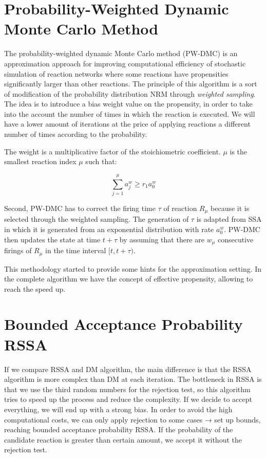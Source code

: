\hypertarget{probability-weighted-dynamic-monte-carlo-method}{%
\section{\texorpdfstring{\textbf{Probability-Weighted Dynamic Monte
Carlo
Method}}{Probability-Weighted Dynamic Monte Carlo Method}}\label{probability-weighted-dynamic-monte-carlo-method}}

The probability-weighted dynamic Monte Carlo method (PW-DMC) is an
approximation approach for improving computational efficiency of
stochastic simulation of reaction networks where some reactions have
propensities significantly larger than other reactions. The principle of
this algorithm is a sort of modification of the probability distribution
NRM through \emph{weighted sampling}. The idea is to introduce a bias
weight value on the propensity, in order to take into the account the
number of times in which the reaction is executed. We will have a lower
amount of iterations at the price of applying reactions a different
number of times according to the probability.

The weight is a multiplicative factor of the stoichiometric coefficient.
$\mu$ is the smallest reaction index $\mu$ such that:

$$
\sum^{\mu}_{j=1} a^w_j \geq r_1 a^w_0 
$$

Second, PW-DMC has to correct the firing time $\tau$ of reaction $R_\mu$
because it is selected through the weighted sampling. The generation of
$\tau$ is adapted from SSA in which it is generated from an exponential
distribution with rate $a^w_0$. PW-DMC then updates the state at time
$t + \tau$ by assuming that there are $w_\mu$ consecutive firings of $R_\mu$ in
the time interval $[t,t + \tau)$.

This methodology started to provide some hints for the approximation
setting. In the complete algorithm we have the concept of effective
propensity, allowing to reach the speed up.

\hypertarget{bounded-acceptance-probability-rssa}{%
\section{Bounded Acceptance Probability
RSSA}\label{bounded-acceptance-probability-rssa}}

If we compare RSSA and DM algorithm, the main difference is that the
RSSA algorithm is more complex than DM at each iteration. The bottleneck
in RSSA is that we use the third random numbers for the rejection test,
so this algorithm tries to speed up the process and reduce the
complexity. If we decide to accept everything, we will end up with a
strong bias. In order to avoid the high computational costs, we can only
apply rejection to some cases → set up bounds, reaching bounded
acceptance probability RSSA. If the probability of the candidate
reaction is greater than certain amount, we accept it without the
rejection test.

